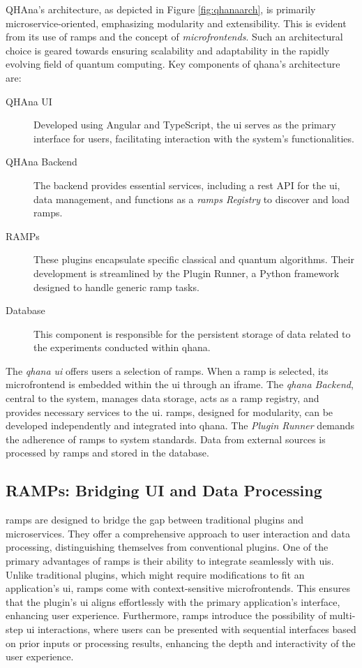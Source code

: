 \documentclass[
  a4paper,  %
  twoside,  %
  bibliography=totoc,
  headsepline,
  cleardoublepage=empty,
  parskip=half,
  draft=false
]{scrbook}
\begin{document}
QHAna's architecture, as depicted in Figure \ref{fig:qhanaarch}, is primarily microservice-oriented, emphasizing modularity and extensibility.
This is evident from its use of \glspl{ramp} and the concept of \emph{microfrontends}.
Such an architectural choice is geared towards ensuring scalability and adaptability in the rapidly evolving field of quantum computing.
Key components of \gls{qhana}'s architecture are:
\begin{description}
  \item[QHAna UI] Developed using Angular and TypeScript, the \gls{ui} serves as the primary interface for users, facilitating interaction with the system's functionalities.
  \item[QHAna Backend] The backend provides essential services, including a \gls{rest} API for the \gls{ui}, data management, and functions as a \emph{\glspl{ramp} Registry} to discover and load \glspl{ramp}.
  \item[RAMPs] These plugins encapsulate specific classical and quantum algorithms. Their development is streamlined by the Plugin Runner, a Python framework designed to handle generic \gls{ramp} tasks.
  \item[Database] This component is responsible for the persistent storage of data related to the experiments conducted within \gls{qhana}.
\end{description}

The \emph{\gls{qhana} \gls{ui}} offers users a selection of \glspl{ramp}.
When a \gls{ramp} is selected, its microfrontend is embedded within the \gls{ui} through an iframe.
The \emph{\gls{qhana} Backend}, central to the system, manages data storage, acts as a \gls{ramp} registry, and provides necessary services to the \gls{ui}.
\glspl{ramp}, designed for modularity, can be developed independently and integrated into \gls{qhana}.
The \emph{Plugin Runner} demands the adherence of \glspl{ramp} to system standards.
Data from external sources is processed by \glspl{ramp} and stored in the database.

\subsection{RAMPs: Bridging UI and Data Processing}
\label{subsec:ramps}

\glspl{ramp} are designed to bridge the gap between traditional plugins and microservices.
They offer a comprehensive approach to user interaction and data processing, distinguishing themselves from conventional plugins.
One of the primary advantages of \glspl{ramp} is their ability to integrate seamlessly with \glspl{ui}.
Unlike traditional plugins, which might require modifications to fit an application's \gls{ui}, \glspl{ramp} come with context-sensitive microfrontends.
This ensures that the plugin's \gls{ui} aligns effortlessly with the primary application's interface, enhancing user experience.
Furthermore, \glspl{ramp} introduce the possibility of multi-step \gls{ui} interactions, where users can be presented with sequential interfaces based on prior inputs or processing results, enhancing the depth and interactivity of the user experience.
\end{document}
